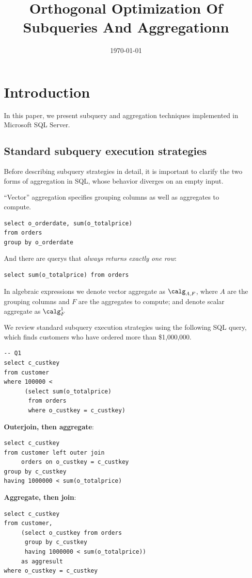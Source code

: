 \documentclass[11pt]{article}
\date{\today}
\title{Orthogonal Optimization Of Subqueries And Aggregationn}
\begin{document}
\maketitle
\section{Introduction}
\label{sec:orgc25cbe9}
In this paper, we present subquery and aggregation techniques implemented in Microsoft SQL Server.
\subsection{Standard subquery execution strategies}
\label{sec:org2b0a137}
Before describing subquery strategies in detail, it is important to clarify the two forms of
aggregation in SQL, whose behavior diverges on an empty input.

“Vector” aggregation specifies grouping columns as well as aggregates to compute.
\begin{verbatim}
select o_orderdate, sum(o_totalprice)
from orders
group by o_orderdate
\end{verbatim}

And there are querys that \emph{always returns exactly one row}:
\begin{verbatim}
select sum(o_totalprice) from orders
\end{verbatim}

In algebraic expressions we denote vector aggregate as \(\calg_{A,F}\), where \(A\) are the grouping
columns and \(F\) are the aggregates to compute; and denote scalar aggregate as \(\calg^1_F\)

We review standard subquery execution strategies using the following SQL query, which finds customers
who have ordered more than \$1,000,000.
\begin{verbatim}
-- Q1
select c_custkey
from customer
where 100000 <
      (select sum(o_totalprice)
       from orders
       where o_custkey = c_custkey)
\end{verbatim}

\textbf{Outerjoin, then aggregate}:
\begin{verbatim}
select c_custkey
from customer left outer join
     orders on o_custkey = c_custkey
group by c_custkey
having 1000000 < sum(o_totalprice)
\end{verbatim}

\textbf{Aggregate, then join}:
\begin{verbatim}
select c_custkey
from customer,
     (select o_custkey from orders
      group by c_custkey
      having 1000000 < sum(o_totalprice))
     as aggresult
where o_custkey = c_custkey
\end{verbatim}
\end{document}
